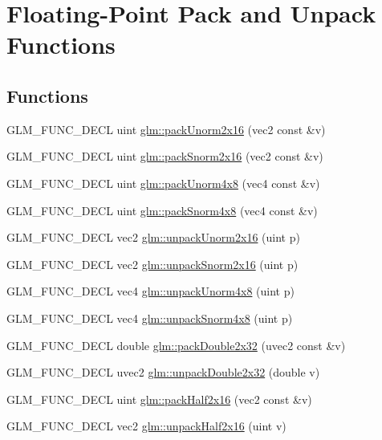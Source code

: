 \hypertarget{group__core__func__packing}{\section{Floating-\/\-Point Pack and Unpack Functions}
\label{group__core__func__packing}
}
\subsection*{Functions}
\begin{DoxyCompactItemize}
\item 
G\-L\-M\-\_\-\-F\-U\-N\-C\-\_\-\-D\-E\-C\-L uint \hyperlink{group__core__func__packing_ga0e2d107039fe608a209497af867b85fb}{glm\-::pack\-Unorm2x16} (vec2 const \&v)
\item 
G\-L\-M\-\_\-\-F\-U\-N\-C\-\_\-\-D\-E\-C\-L uint \hyperlink{group__core__func__packing_ga977ab172da5494e5ac63e952afacfbe2}{glm\-::pack\-Snorm2x16} (vec2 const \&v)
\item 
G\-L\-M\-\_\-\-F\-U\-N\-C\-\_\-\-D\-E\-C\-L uint \hyperlink{group__core__func__packing_gaf7d2f7341a9eeb4a436929d6f9ad08f2}{glm\-::pack\-Unorm4x8} (vec4 const \&v)
\item 
G\-L\-M\-\_\-\-F\-U\-N\-C\-\_\-\-D\-E\-C\-L uint \hyperlink{group__core__func__packing_ga85e8f17627516445026ab7a9c2e3531a}{glm\-::pack\-Snorm4x8} (vec4 const \&v)
\item 
G\-L\-M\-\_\-\-F\-U\-N\-C\-\_\-\-D\-E\-C\-L vec2 \hyperlink{group__core__func__packing_ga1f66188e5d65afeb9ffba1ad971e4007}{glm\-::unpack\-Unorm2x16} (uint p)
\item 
G\-L\-M\-\_\-\-F\-U\-N\-C\-\_\-\-D\-E\-C\-L vec2 \hyperlink{group__core__func__packing_gacd8f8971a3fe28418be0d0fa1f786b38}{glm\-::unpack\-Snorm2x16} (uint p)
\item 
G\-L\-M\-\_\-\-F\-U\-N\-C\-\_\-\-D\-E\-C\-L vec4 \hyperlink{group__core__func__packing_ga7f903259150b67e9466f5f8edffcd197}{glm\-::unpack\-Unorm4x8} (uint p)
\item 
G\-L\-M\-\_\-\-F\-U\-N\-C\-\_\-\-D\-E\-C\-L vec4 \hyperlink{group__core__func__packing_ga2db488646d48b7c43d3218954523fe82}{glm\-::unpack\-Snorm4x8} (uint p)
\item 
G\-L\-M\-\_\-\-F\-U\-N\-C\-\_\-\-D\-E\-C\-L double \hyperlink{group__core__func__packing_gaa916ca426b2bb0343ba17e3753e245c2}{glm\-::pack\-Double2x32} (uvec2 const \&v)
\item 
G\-L\-M\-\_\-\-F\-U\-N\-C\-\_\-\-D\-E\-C\-L uvec2 \hyperlink{group__core__func__packing_ga5f4296dc5f12f0aa67ac05b8bb322483}{glm\-::unpack\-Double2x32} (double v)
\item 
G\-L\-M\-\_\-\-F\-U\-N\-C\-\_\-\-D\-E\-C\-L uint \hyperlink{group__core__func__packing_ga20f134b07db3a3d3a38efb2617388c92}{glm\-::pack\-Half2x16} (vec2 const \&v)
\item 
G\-L\-M\-\_\-\-F\-U\-N\-C\-\_\-\-D\-E\-C\-L vec2 \hyperlink{group__core__func__packing_gaf59b52e6b28da9335322c4ae19b5d745}{glm\-::unpack\-Half2x16} (uint v)
\end{DoxyCompactItemize}


